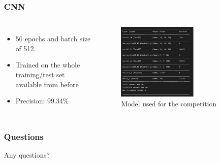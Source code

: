 \documentclass[aspectratio=169]{beamer}
\begin{document}
\begin{frame}[t]
    \frametitle{CNN}



    \begin{columns}

        \begin{itemize}
            \item 50 epochs and batch size of 512.
            \item Trained on the whole training/test set available from before
            \item Precision: 99.34\%
        \end{itemize}
        \begin{figure}[ht!]
            \centering
            \includegraphics[width=0.65\textwidth]{figures/cnn_archi.png}
            \caption{Model used for the competition}
            \label{fig:cnn_model}
        \end{figure}
    \end{columns}
\end{frame}
\begin{frame}[t]
    \frametitle{Questions}
    \vspace{2.0cm}
    \begin{center}
        Any questions?
    \end{center}
\end{frame}
\end{document}
